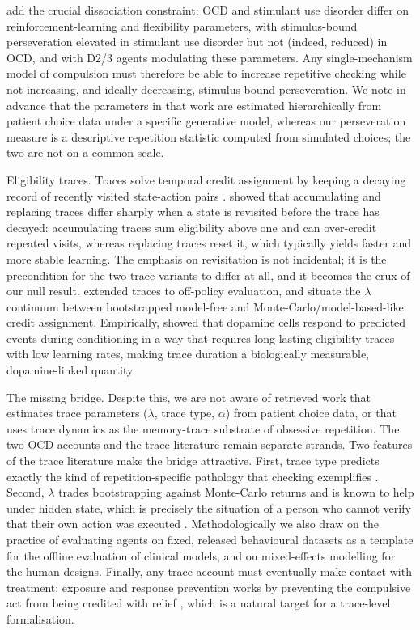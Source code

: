 \documentclass[11pt,a4paper]{article}
\begin{document}
\citet{kanen2019computational} add the crucial dissociation constraint: OCD and stimulant use disorder differ on reinforcement-learning and flexibility parameters, with stimulus-bound perseveration elevated in stimulant use disorder but not (indeed, reduced) in OCD, and with D2/3 agents modulating these parameters. Any single-mechanism model of compulsion must therefore be able to increase repetitive checking while not increasing, and ideally decreasing, stimulus-bound perseveration. We note in advance that the parameters in that work are estimated hierarchically from patient choice data under a specific generative model, whereas our perseveration measure is a descriptive repetition statistic computed from simulated choices; the two are not on a common scale.

Eligibility traces. Traces solve temporal credit assignment by keeping a decaying record of recently visited state-action pairs \citep{kaelbling1996reinforcement}. \citet{singh1996reinforcement} showed that accumulating and replacing traces differ sharply when a state is revisited before the trace has decayed: accumulating traces sum eligibility above one and can over-credit repeated visits, whereas replacing traces reset it, which typically yields faster and more stable learning. The emphasis on revisitation is not incidental; it is the precondition for the two trace variants to differ at all, and it becomes the crux of our null result. \citet{precup2000eligibility} extended traces to off-policy evaluation, and \citet{moerland2023modelbased} situate the $\lambda$ continuum between bootstrapped model-free and Monte-Carlo/model-based-like credit assignment. Empirically, \citet{pan2005dopamine} showed that dopamine cells respond to predicted events during conditioning in a way that requires long-lasting eligibility traces with low learning rates, making trace duration a biologically measurable, dopamine-linked quantity.

The missing bridge. Despite this, we are not aware of retrieved work that estimates trace parameters ($\lambda$, trace type, $\alpha$) from patient choice data, or that uses trace dynamics as the memory-trace substrate of obsessive repetition. The two OCD accounts and the trace literature remain separate strands. Two features of the trace literature make the bridge attractive. First, trace type predicts exactly the kind of repetition-specific pathology that checking exemplifies \citep{singh1996reinforcement}. Second, $\lambda$ trades bootstrapping against Monte-Carlo returns and is known to help under hidden state, which is precisely the situation of a person who cannot verify that their own action was executed \citep{kaelbling1996reinforcement}. Methodologically we also draw on the practice of evaluating agents on fixed, released behavioural datasets \citep{fu2020datasets} as a template for the offline evaluation of clinical models, and on mixed-effects modelling \citep{bates2015fitting} for the human designs. Finally, any trace account must eventually make contact with treatment: exposure and response prevention works by preventing the compulsive act from being credited with relief \citep{clark2003cognitivebehavioral}, which is a natural target for a trace-level formalisation.
\end{document}
